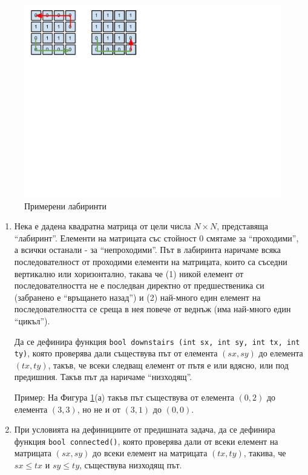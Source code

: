 {\begin{figure}
\includegraphics[width=15cm]{images/path1}
\vspace{-200px}
\caption{Примерени лабиринти}
\label{fig:samplelab}
\end{figure}


\begin{enumerate}[resume]

	\item \label{zad:labds} Нека е дадена квадратна матрица от цели числа $N \times N$, представяща ``лабиринт''. Елементи на матрицата със стойност $0$ смятаме за ``проходими'', а всички останали - за ``непроходими''. Път в лабиринта наричаме всяка последователност от проходими елементи на матрицата, които са съседни вертикално или хоризонтално, такава че (1) никой елемент от последователността не е последван директно от предшественика си (забранено е ``връщането назад'') и (2) най-много един елемент на последователността се среща в нея повече от веднъж (има най-много един ``цикъл'').

	Да се дефинира функция \texttt{bool downstairs (int sx, int sy, int tx, int ty)}, която проверява дали съществува път от елемента $(sx,sy)$ до елемента $(tx,ty)$, такъв, че всеки следващ елемент от пътя е или вдясно, или под предишния. Такъв път да наричаме ``низходящ''.

	Пример: На Фигура \ref{fig:samplelab}(а) такъв път съществува от елемента $(0,2)$ до елемента $(3,3)$, но не и от $(3,1)$ до $(0,0)$.

	\item При условията на дефинициите от предишната задача, да се дефинира функция \texttt{bool connected()}, която проверява дали от всеки елемент на матрицата $(sx,sy)$ до всеки елемент на матрицата  $(tx,ty)$, такива, че $sx \leq tx$ и $sy \leq ty$, съществува низходящ път.


\end{enumerate}}

